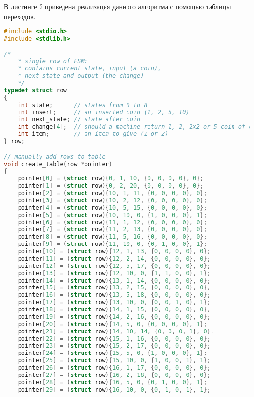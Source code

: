 В листинге 2 приведена реализация данного алгоритма с помощью таблицы переходов.

\begin{lstlisting}[language=c, caption={Фрагмент функции main}]
#include <stdio.h>
#include <stdlib.h>

/*
    * single row of FSM:
    * contains current state, input (a coin),
    * next state and output (the change)
    */
typedef struct row
{
    int state;      // states from 0 to 8
    int insert;     // an inserted coin (1, 2, 5, 10)
    int next_state; // state after coin
    int change[4];  // should a machine return 1, 2, 2x2 or 5 coin of change
    int item;       // an item to give (1 or 2)
} row;

// manually add rows to table
void create_table(row *pointer)
{
    pointer[0] = (struct row){0, 1, 10, {0, 0, 0, 0}, 0};
    pointer[1] = (struct row){0, 2, 20, {0, 0, 0, 0}, 0};
    pointer[2] = (struct row){10, 1, 11, {0, 0, 0, 0}, 0};
    pointer[3] = (struct row){10, 2, 12, {0, 0, 0, 0}, 0};
    pointer[4] = (struct row){10, 5, 15, {0, 0, 0, 0}, 0};
    pointer[5] = (struct row){10, 10, 0, {1, 0, 0, 0}, 1};
    pointer[6] = (struct row){11, 1, 12, {0, 0, 0, 0}, 0};
    pointer[7] = (struct row){11, 2, 13, {0, 0, 0, 0}, 0};
    pointer[8] = (struct row){11, 5, 16, {0, 0, 0, 0}, 0};
    pointer[9] = (struct row){11, 10, 0, {0, 1, 0, 0}, 1};
    pointer[10] = (struct row){12, 1, 13, {0, 0, 0, 0}, 0};
    pointer[11] = (struct row){12, 2, 14, {0, 0, 0, 0}, 0};
    pointer[12] = (struct row){12, 5, 17, {0, 0, 0, 0}, 0};
    pointer[13] = (struct row){12, 10, 0, {1, 1, 0, 0}, 1};
    pointer[14] = (struct row){13, 1, 14, {0, 0, 0, 0}, 0};
    pointer[15] = (struct row){13, 2, 15, {0, 0, 0, 0}, 0};
    pointer[16] = (struct row){13, 5, 18, {0, 0, 0, 0}, 0};
    pointer[17] = (struct row){13, 10, 0, {0, 0, 1, 0}, 1};
    pointer[18] = (struct row){14, 1, 15, {0, 0, 0, 0}, 0};
    pointer[19] = (struct row){14, 2, 16, {0, 0, 0, 0}, 0};
    pointer[20] = (struct row){14, 5, 0, {0, 0, 0, 0}, 1};
    pointer[21] = (struct row){14, 10, 14, {0, 0, 0, 1}, 0};
    pointer[22] = (struct row){15, 1, 16, {0, 0, 0, 0}, 0};
    pointer[23] = (struct row){15, 2, 17, {0, 0, 0, 0}, 0};
    pointer[24] = (struct row){15, 5, 0, {1, 0, 0, 0}, 1};
    pointer[25] = (struct row){15, 10, 0, {1, 0, 0, 1}, 1};
    pointer[26] = (struct row){16, 1, 17, {0, 0, 0, 0}, 0};
    pointer[27] = (struct row){16, 2, 18, {0, 0, 0, 0}, 0};
    pointer[28] = (struct row){16, 5, 0, {0, 1, 0, 0}, 1};
    pointer[29] = (struct row){16, 10, 0, {0, 1, 0, 1}, 1};

\end{lstlisting}
